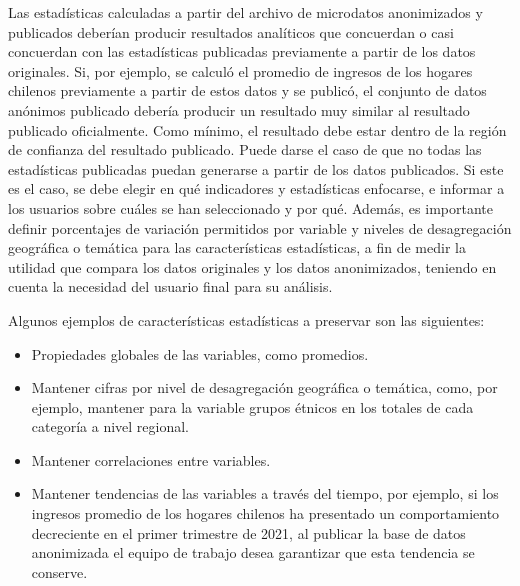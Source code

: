 \documentclass[
]{book}
\providecommand{\tightlist}{%
  \setlength{\itemsep}{0pt}\setlength{\parskip}{0pt}}
\theoremstyle{definition}
\theoremstyle{definition}
\theoremstyle{definition}
\theoremstyle{definition}
\theoremstyle{remark}
\begin{document}
Las estadísticas calculadas a partir del archivo de microdatos anonimizados y publicados deberían producir resultados analíticos que concuerdan o casi concuerdan con las estadísticas publicadas previamente a partir de los datos originales. Si, por ejemplo, se calculó el promedio de ingresos de los hogares chilenos previamente a partir de estos datos y se publicó, el conjunto de datos anónimos publicado debería producir un resultado muy similar al resultado publicado oficialmente. Como mínimo, el resultado debe estar dentro de la región de confianza del resultado publicado. Puede darse el caso de que no todas las estadísticas publicadas puedan generarse a partir de los datos publicados. Si este es el caso, se debe elegir en qué indicadores y estadísticas enfocarse, e informar a los usuarios sobre cuáles se han seleccionado y por qué. Además, es importante definir porcentajes de variación permitidos por variable y niveles de desagregación geográfica o temática para las características estadísticas, a fin de medir la utilidad que compara los datos originales y los datos anonimizados, teniendo en cuenta la necesidad del usuario final para su análisis.

Algunos ejemplos de características estadísticas a preservar son las siguientes:

\begin{itemize}
\tightlist
\item
  Propiedades globales de las variables, como promedios.
\item
  Mantener cifras por nivel de desagregación geográfica o temática, como, por ejemplo, mantener para la variable grupos étnicos en los totales de cada categoría a nivel regional.
\item
  Mantener correlaciones entre variables.
\item
  Mantener tendencias de las variables a través del tiempo, por ejemplo, si los ingresos promedio de los hogares chilenos ha presentado un comportamiento decreciente en el primer trimestre de 2021, al publicar la base de datos anonimizada el equipo de trabajo desea garantizar que esta tendencia se conserve.
\end{itemize}
\end{document}
